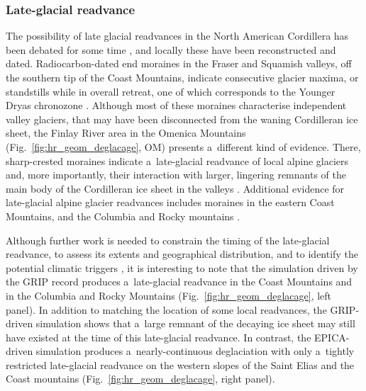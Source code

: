 \documentclass[tc, manuscript]{copernicus}
\begin{document}
\subsubsection{Late-glacial readvance}

      The possibility of late glacial readvances in the North American
      Cordillera has been debated for some time \citep{Osborn.Gerloff.1997},
      and locally these have been reconstructed and dated. Radiocarbon-dated
      end moraines in the Fraser and Squamish valleys, off the southern tip
      of the Coast Mountains, indicate consecutive glacier maxima, or
      standstills while in overall retreat, one of which corresponds to the
      Younger Dryas chronozone \citep{Clague.etal.1997, Friele.Clague.2002,
      Friele.Clague.2002a, Kovanen.2002, Kovanen.Easterbrook.2002}. Although
      most of these moraines characterise independent valley glaciers, that
      may have been disconnected from the waning Cordilleran ice sheet, the
      Finlay River area in the Omenica Mountains
      (Fig.~\ref{fig:hr_geom_deglacage}, OM) presents a~different kind of
      evidence. There, sharp-crested moraines indicate a~late-glacial
      readvance of local alpine glaciers and, more importantly, their
      interaction with larger, lingering remnants of the main body of the
      Cordilleran ice sheet in the valleys \citep{Lakeman.etal.2008}.
      Additional evidence for late-glacial alpine glacier readvances
      includes moraines in the eastern Coast Mountains, and the Columbia and
      Rocky mountains \citep{Osborn.Gerloff.1997, Menounos.etal.2008}.

      Although further work is needed to constrain the timing of the
      late-glacial readvance, to assess its extents and geographical
      distribution, and to identify the potential climatic triggers
      \citep{Menounos.etal.2008}, it is interesting to note that the
      simulation driven by the GRIP record produces a~late-glacial readvance
      in the Coast Mountains and in the Columbia and Rocky Mountains
      (Fig.~\ref{fig:hr_geom_deglacage}, left panel). In addition to
      matching the location of some local readvances, the GRIP-driven
      simulation shows that a~large remnant of the decaying ice sheet may
      still have existed at the time of this late-glacial readvance. In
      contrast, the EPICA-driven simulation produces a~nearly-continuous
      deglaciation with only a~tightly restricted late-glacial readvance on
      the western slopes of the Saint Elias and the Coast mountains
      (Fig.~\ref{fig:hr_geom_deglacage}, right panel).
\end{document}
